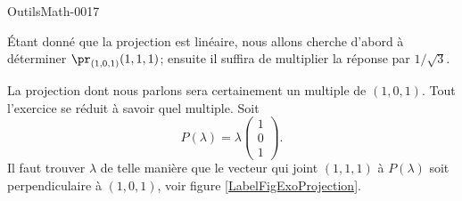 
\begin{corrige}{OutilsMath-0017}



	\newcommand{\CaptionFigExoProjection}{Pour l'exercice \ref{exoOutilsMath-0017}. À partir du point $A$, il faut trouver quel vecteur tombe perpendiculairement à la droite contenant $w$.}


Étant donné que la projection est linéaire, nous allons cherche d'abord à déterminer \( \pr_{(1,0,1)}(1,1,1)\); ensuite il suffira de multiplier la réponse par \( 1/\sqrt{3}\).

	La projection dont nous parlons sera certainement un multiple de $(1,0,1)$. Tout l'exercice se réduit à savoir quel multiple. Soit
	\begin{equation}
		P(\lambda)=\lambda\begin{pmatrix}
			1	\\ 
			0	\\ 
			1	
		\end{pmatrix}.
	\end{equation}
	Il faut trouver $\lambda$ de telle manière que le vecteur qui joint $(1,1,1)$ à $P(\lambda)$ soit perpendiculaire à $(1,0,1)$, voir figure \ref{LabelFigExoProjection}.
	

\end{corrige}
